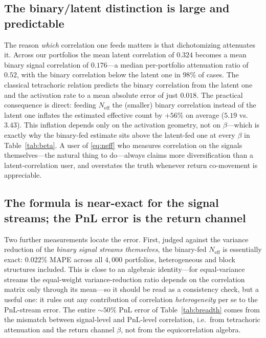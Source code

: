 \documentclass[11pt]{article}
\newcommand{\Neff}{N_{\mathrm{eff}}}
\begin{document}
\subsection{The binary/latent distinction is large and predictable}
\label{sec:tetrachoric}

The reason \emph{which} correlation one feeds matters is that dichotomizing
attenuates it. Across our portfolios the mean latent correlation of $0.324$ becomes
a mean binary signal correlation of $0.176$---a median per-portfolio attenuation
ratio of $0.52$, with the binary correlation below the latent one in $98\%$ of
cases. The classical tetrachoric relation predicts the binary correlation from
the latent one and the activation rate to a mean absolute error of just
$0.018$. The practical consequence is direct: feeding $\Neff$ the (smaller)
binary correlation instead of the latent one inflates the estimated effective
count by $+56\%$ on average ($5.19$ vs.\ $3.43$). This inflation depends only on
the activation geometry, not on $\beta$---which is exactly why the binary-fed
estimate sits above the latent-fed one at every $\beta$ in
Table~\ref{tab:beta}. A user of \eqref{eq:neff} who measures correlation on the
signals themselves---the natural thing to do---always claims more
diversification than a latent-correlation user, and overstates the truth
whenever return co-movement is appreciable.

\subsection{The formula is near-exact for the signal streams; the PnL error is
the return channel}
\label{sec:channel}

Two further measurements locate the error. First, judged against the variance
reduction of the \emph{binary signal streams themselves}, the binary-fed
$\Neff$ is essentially exact: $0.022\%$ MAPE across all $4{,}000$ portfolios,
heterogeneous and block structures included. This is close to an algebraic
identity---for equal-variance streams the equal-weight variance-reduction ratio
depends on the correlation matrix only through its mean---so it should be read
as a consistency check, but a useful one: it rules out any contribution of
correlation \emph{heterogeneity} per se to the PnL-stream error. The entire
${\sim}50\%$ PnL error of Table~\ref{tab:breadth} comes from the mismatch
between signal-level and PnL-level correlation, i.e.\ from tetrachoric
attenuation and the return channel $\beta$, not from the equicorrelation
algebra.
\end{document}
